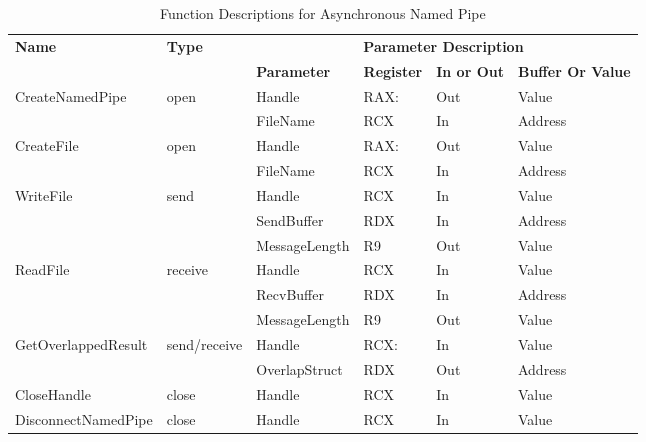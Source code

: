 \begin{table}[H]
  \centering
  \caption{Function Descriptions for Asynchronous Named Pipe}
  \label{asynfunctions}
  \begin{tabular}{|l|l|l|l|l|l|}
      \hline
       \multirow{2}{*}{{\textbf{Name}}} & \multirow{2}{*}{{\textbf{Type}}} & \multicolumn{4}{c|}{\textbf{Parameter Description}}  \\
        \cline{3-6} 
       & & \textbf{Parameter}& \textbf{Register}& \textbf{In or Out} &  \textbf{Buffer Or Value}  \\
       \hline
       \multirow{2}{*}{CreateNamedPipe}
       &\multirow{2}{*}{open} &  Handle & RAX: & Out & Value\\
        \cline{3-6} 
       & & FileName & RCX & In & Address\\
      \hline         
      \multirow{2}{*}{CreateFile}
       &\multirow{2}{*}{open} &  Handle & RAX: & Out & Value\\
        \cline{3-6} 
       & & FileName & RCX & In & Address\\
      \hline              
      \multirow{3}{*}{WriteFile}
       &\multirow{3}{*}{send} &  Handle & RCX & In & Value\\
        \cline{3-6} 
       & & SendBuffer & RDX & In & Address\\
        \cline{3-6} 
       & & MessageLength & R9 & Out & Value\\
      \hline            
      \multirow{3}{*}{ReadFile}
       &\multirow{3}{*}{receive} &  Handle & RCX & In & Value\\
        \cline{3-6} 
       & & RecvBuffer & RDX & In & Address\\
        \cline{3-6} 
       & & MessageLength & R9 & Out & Value\\
      \hline  
      \multirow{2}{*}{GetOverlappedResult}
       &\multirow{2}{*}{send/receive} &  Handle & RCX: & In & Value\\
        \cline{3-6} 
       & & OverlapStruct & RDX & Out & Address\\
      \hline            
      CloseHandle &
       close &  Handle & RCX & In & Value\\
      \hline            
      DisconnectNamedPipe &
      close &  Handle & RCX & In & Value\\
      \hline               
  \end{tabular}
\end{table}

